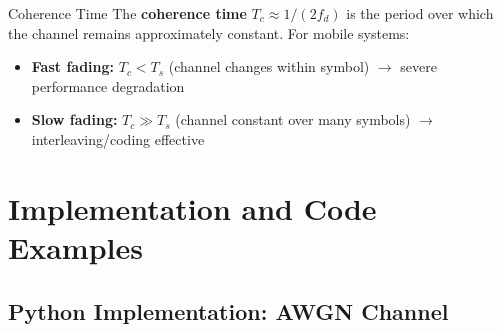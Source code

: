 \begin{calloutbox}{Coherence Time}
The \textbf{coherence time} $T_c \approx 1/(2f_d)$ is the period over which the channel remains approximately constant. For mobile systems:
\begin{itemize}
\item \textbf{Fast fading:} $T_c < T_s$ (channel changes within symbol) $\rightarrow$ severe performance degradation
\item \textbf{Slow fading:} $T_c \gg T_s$ (channel constant over many symbols) $\rightarrow$ interleaving/coding effective
\end{itemize}
\end{calloutbox}

\section{Implementation and Code Examples}

\subsection{Python Implementation: AWGN Channel}

\begin{Shaded}
\begin{Highlighting}[]

\CommentTok{    }
\CommentTok{        }
\OperatorTok{=}\OperatorTok{**}\NormalTok{)}
    
\OperatorTok{=} \OperatorTok{**}\OperatorTok{/}\NormalTok{)}
\OperatorTok{=}\OperatorTok{/}
    
\OperatorTok{=}\OperatorTok{/}\NormalTok{) }\OperatorTok{*}\OperatorTok{+} 
                                       \OperatorTok{*}
    
    \OperatorTok{+}
\end{Highlighting}
\end{Shaded}

